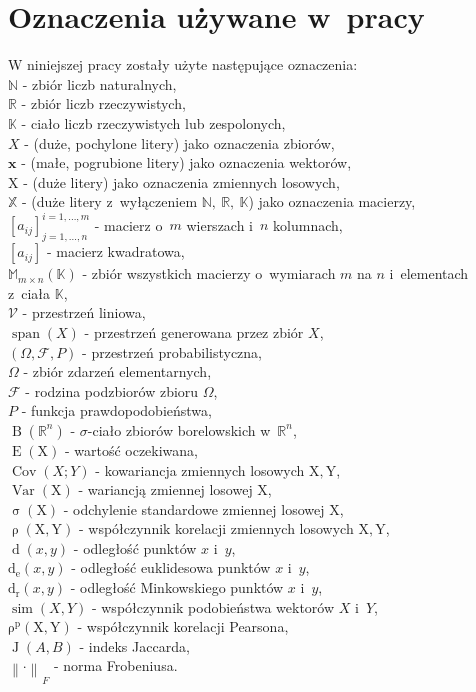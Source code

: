 \documentclass[12pt,a4paper]{report}
\newcommand{\setR}{\mathbb{R}}
\newcommand{\setK}{\mathbb{K}}
\newcommand{\setN}{\mathbb{N}}
\newcommand{\ro}[2]{\operatorname{\rho}\left( {#1},{#2} \right)}
\newcommand{\rop}[2]{\operatorname{\rho^p}\left( {#1},{#2} \right)}
\newcommand{\J}[2]{\operatorname{J}\left({#1}, {#2} \right)}
\newcommand{\similarity}[2]{\operatorname{sim}\left({#1}, {#2} \right)}
\newcommand{\przestrzen}[1]{\operatorname{span}\left({#1} \right)}
\newcommand{\distance}[2]{\operatorname{d}\left({#1}, {#2} \right)}
\newcommand{\distancee}[2]{\operatorname{d_r}\left({#1}, {#2} \right)}
\newcommand{\distanceee}[2]{\operatorname{d_e}\left({#1}, {#2} \right)}
\newcommand{\Covariance}[2]{\operatorname{Cov}\left({#1}; {#2} \right)}
\newcommand{\norm}[2][]{\left\| {#2} \right\|_{#1}}
\newcommand{\variance}[1]{\operatorname{Var}\left({#1} \right)}
\newcommand{\e}[1]{\operatorname{E}\left({#1} \right)}
\newcommand{\standard}[1]{\operatorname{\sigma}\left({#1} \right)}
\newcommand{\sigmacialo}[1]{\operatorname{B}\left({#1} \right)}
\begin{document}
\section{Oznaczenia używane w~pracy}
W niniejszej pracy zostały użyte następujące oznaczenia:
\\$\setN$ - zbiór liczb naturalnych,
\\$\setR$ - zbiór liczb rzeczywistych,
\\$\setK$ - ciało liczb rzeczywistych lub zespolonych,
\\$\mathit{X}$ - (duże, pochylone litery) jako oznaczenia zbiorów,
\\$\mathbf{x}$ - (małe, pogrubione litery) jako oznaczenia wektorów,
\\$\mathrm{X}$ - (duże litery) jako oznaczenia zmiennych losowych,
\\$\mathbb{X}$ - (duże litery z~wyłączeniem $\setN, \: \setR, \: \setK$) jako oznaczenia macierzy,
\\$[a_{ij}]_{j = 1, \ldots, n}^{i = 1, \ldots , m}$ - macierz o~$m$ wierszach i~$n$ kolumnach,
\\$[a_{ij}]$ - macierz kwadratowa,
\\$\mathbb{M}_{m \times n}(\setK)$ - zbiór wszystkich macierzy o~wymiarach $m$ na $n$ i~elementach z~ciała $\setK$,
\\$\mathcal{V}$ - przestrzeń liniowa,
\\$\przestrzen{\mathit{X}}$ - przestrzeń generowana przez zbiór $\mathit{X}$,
\\$(\Omega, \mathcal{F}, P)$ - przestrzeń probabilistyczna,
\\$\Omega$ - zbiór zdarzeń elementarnych,
\\$\mathcal{F}$ - rodzina podzbiorów zbioru $\Omega$,
\\$P$ - funkcja prawdopodobieństwa,
\\$\sigmacialo{\setR^n}$ - $\sigma$-ciało zbiorów borelowskich w~$\setR^n$,
\\$\e{\mathrm{X}}$ - wartość oczekiwana,
\\$\Covariance{X}{Y}$ - kowariancja zmiennych losowych $\mathrm{X},\mathrm{Y}$,
\\$\variance{\mathrm{X}}$ - wariancją zmiennej losowej $\mathrm{X}$,
\\$\standard{\mathrm{X}}$ - odchylenie standardowe zmiennej losowej $\mathrm{X}$,
\\$\ro{\mathrm{X}}{\mathrm{Y}}$ - współczynnik korelacji zmiennych losowych $\mathrm{X},\mathrm{Y}$,
\\$\distance{x}{y}$ - odległość punktów $x$ i~$y$,
\\$\distanceee{x}{y}$ - odległość euklidesowa punktów $x$ i~$y$,
\\$\distancee{x}{y}$ - odległość Minkowskiego punktów $x$ i~$y$,
\\$\similarity{X}{Y}$ - współczynnik podobieństwa wektorów $X$ i~$Y$,
\\$\rop{\mathrm{X}}{\mathrm{Y}}$ - współczynnik korelacji Pearsona,
\\$\J{\mathit{A}}{\mathit{B}}$ - indeks Jaccarda,
\\ ${\norm{\cdot}}_F$ - norma Frobeniusa.
\end{document}

